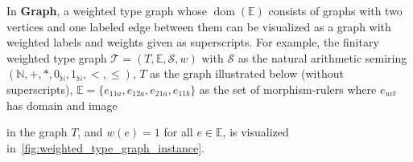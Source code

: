 \begin{example}
    \label{wf:example:weighted_type_graph}
     In \textbf{Graph}, a weighted type graph 
     whose $\operatorname{dom}(\mathbb{E})$ consists of graphs with two vertices and one labeled edge between them
     can be visualized as a graph with weighted labels and weights given as superscripts. For example, the finitary weighted type graph $\mathcal{T} = (T, \mathbb{E}, \mathcal{S}, w)$ with $\mathcal{S}$ as the natural arithmetic semiring $(\mathbb{N}, +, *, 0_\mathbb{N}, 1_\mathbb{N}, <,\leq)$,
     $T$ as the graph illustrated below (without superscripts), $\mathbb{E}=\{e_{11a},e_{12a},e_{21a},e_{11b}\}$ as the set of morphism-rulers where 
     $e_{uvl}$ has domain 
      and image 
     in the graph $T$,
    and $w(e) = 1$ for all $e \in \mathbb{E}$, is visualized in~\autoref{fig:weighted_type_graph_instance}.
    \begin{figure}[hbtp]
        \centering
        \caption{}
        \label{fig:weighted_type_graph_instance}
    \end{figure}
\end{example}